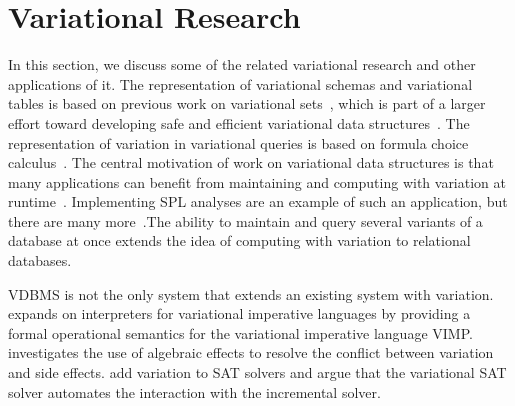 \section{Variational Research}
\label{sec:varresearch}

In this section, we discuss some of the related variational research and other applications of it. 
%
The representation of variational schemas and variational tables is based on previous
work on variational sets~\cite{EWC13fosd}, which is part of a larger effort
toward developing safe and efficient variational data
structures~\cite{Walk14onward,MMWWK17vamos}. 
%
The representation of variation in variational queries is based on 
formula choice calculus~\cite{Walk13thesis, HW16fosd}.
%
The central motivation of work on
variational data structures is that many applications can benefit from
maintaining and computing with variation at
runtime~\cite{EW11gttse,CEW16ecoop}. Implementing SPL analyses
are an example of such an application, but there are many
more~\cite{Walk14onward}.The ability to maintain and query several
variants of a database at once extends the idea of computing with variation to
relational databases.

VDBMS is not the only system that extends an existing system with variation. 
\citet{Grasley18} expands on interpreters for variational imperative
languages by providing a formal operational semantics for the variational imperative
language VIMP.
\citet{Alkubaish20} investigates the use of 
algebraic effects to resolve the conflict between variation and side effects.
\citet{young20} add variation to SAT solvers and argue that the variational SAT solver
automates the interaction with the incremental solver.




